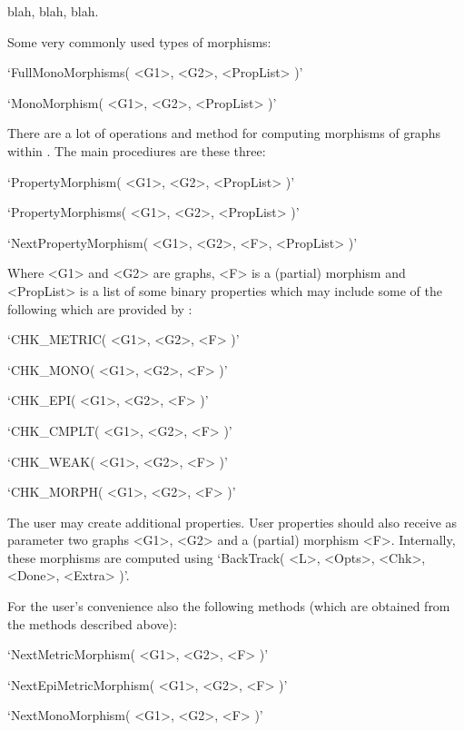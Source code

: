 
blah, blah, blah.


Some very commonly used types of morphisms:

\beginitems
`FullMonoMorphisms( <G1>, <G2>, <PropList> )'

`MonoMorphism( <G1>, <G2>, <PropList> )'
\enditems


There are a lot of operations and method for computing morphisms of graphs within {\YAGS}.
The main procediures are these three:

\beginitems
`PropertyMorphism( <G1>, <G2>, <PropList> )'

`PropertyMorphisms( <G1>, <G2>, <PropList> )'

`NextPropertyMorphism( <G1>, <G2>, <F>, <PropList> )'
\enditems

Where <G1> and <G2> are graphs, <F> is a (partial) morphism and <PropList> is a list 
of some binary properties which may include some of the following which are provided by {\YAGS}: 

\beginitems
`CHK_METRIC( <G1>, <G2>, <F> )'

`CHK_MONO( <G1>, <G2>, <F> )'

`CHK_EPI( <G1>, <G2>, <F> )'

`CHK_CMPLT( <G1>, <G2>, <F> )'

`CHK_WEAK( <G1>, <G2>, <F> )'

`CHK_MORPH( <G1>, <G2>, <F> )'
\enditems



The user may create additional properties. User properties should also receive as 
parameter two graphs <G1>, <G2> and a (partial) morphism <F>. Internally, these morphisms 
are computed using `BackTrack( <L>, <Opts>, <Chk>, <Done>, <Extra> )'.



For the user's convenience also the following methods 
(which are obtained from the methods described above):


\beginitems
`NextMetricMorphism( <G1>, <G2>, <F> )'

`NextEpiMetricMorphism( <G1>, <G2>, <F> )'

`NextMonoMorphism( <G1>, <G2>, <F> )'

